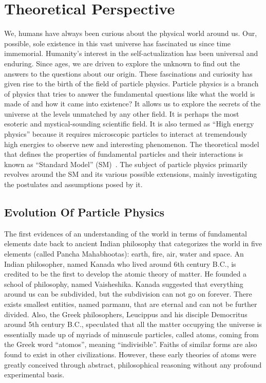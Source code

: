 \chapter{Theoretical Perspective}
We, humans have always been curious about the physical world around us. Our, possible, sole existence in this vast universe has fascinated us since time immemorial.
Humanity's interest in the self-actualization has been universal and enduring. 
Since ages, we are driven to explore the unknown to find out the answers to the questions about our origin.
These fascinations and curiosity has given rise to the birth of the field of particle physics. Particle physics is a branch of physics that tries to answer
the fundamental questions like what the world is made of and how it came into existence?
It allows us to explore the secrets of the universe at the levels unmatched by any other field. It is perhaps the most esoteric and
mystical-sounding scientific field. It is also termed as
``High energy physics'' because it requires microscopic particles to interact at tremendously high energies to observe new and interesting phenomenon.
The theoretical model that defines the properties of fundamental particles and their interactions is known as ``Standard Model''
(SM)~\cite{Glashow:1961tr, Salam:1964ry, Weinberg:1967tq,Gross:1973id, Politzer:1973fx}.
The subject of particle physics primarily revolves around the SM and its various possible extensions, mainly investigating the postulates
and assumptions posed by it.
\section{Evolution Of Particle Physics}
The first evidences of an understanding of the world in terms of fundamental elements date back to ancient Indian philosophy that categorizes the world in five
elements (called Pancha Mahabhootas): earth, fire, air, water and space. An Indian philosopher, named Kanada who lived around 6th century B.C.,
is credited to be the first to develop the atomic theory of matter.
He founded a school of philosophy, named Vaisheshika. Kanada suggested that everything around us can be subdivided, but the subdivision can not go on forever.
There exists smallest entities, named parmanu, that are eternal and can not be further divided. Also, the Greek philosophers, Leucippus and his
disciple Democritus around 5th century B.C., speculated that all the matter occupying the universe is essentially made up of myriads of minuscule particles,
called atoms, coming from the Greek word ``atomos'',
meaning ``indivisible''. Faiths of similar forms are also found to exist in other civilizations. However, these early theories of atoms were
greatly conceived through abstract, philosophical reasoning without any profound experimental basis.

